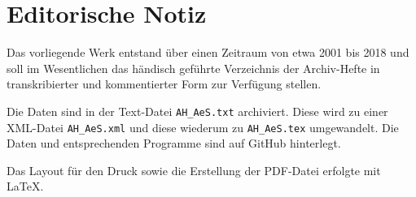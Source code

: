 \documentclass[a4paper]{scrbook}
\begin{document}



\chapter{Editorische Notiz}
Das vorliegende Werk entstand über einen Zeitraum von etwa 2001 bis 2018 und soll im Wesentlichen das händisch geführte Verzeichnis der Archiv-Hefte in transkribierter und kommentierter Form zur Verfügung stellen.

Die Daten sind in der Text-Datei \texttt{AH\_AeS.txt} archiviert. Diese wird zu einer XML-Datei \texttt{AH\_AeS.xml} und diese wiederum zu \texttt{AH\_AeS.tex} umgewandelt. Die Daten und entsprechenden Programme sind auf GitHub hinterlegt.

Das Layout für den Druck sowie die Erstellung der PDF-Datei erfolgte mit \LaTeX.
\end{document}
